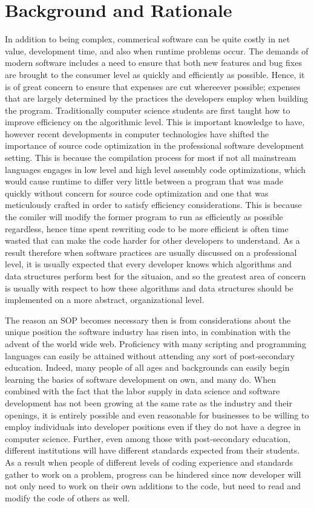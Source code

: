 \documentclass[12pt, letterpaper]{article}
\begin{document}
\section{Background and Rationale}
  In addition to being complex, commerical software can be quite costly in net value, development time, and also when runtime problems occur.
  The demands of modern software includes a need to ensure that both new features and bug fixes are brought to the consumer level as quickly and efficiently as possible. Hence, it is of great
  concern to ensure that expenses are cut whereever possible; expenses that are largely determined by the practices the developers employ when building the program. Traditionally computer
  science students are first taught how to improve efficiency on the algorithmic level. This is important knowledge to have, however recent developments in computer technologies have shifted the importance of
  source code optimization in the professional software development setting. This is because the compilation process for most if not all mainstream languages engages in low level and high level assembly code
  optimizations, which would cause runtime to differ very little between a program that was made quickly without concern for source code optimization and one that was meticulously crafted in order to
  satisfy efficiency considerations. This is because the comiler will modify the former program to run as efficiently as possible regardless, hence time spent rewriting code to be more efficient is often time
  wasted that can make the code harder for other developers to understand. As a result therefore when software practices are usually discussed on a professional level, it is usually expected that every developer
  knows which algorithms and data structures perform best for the situaion, and so the greatest area of concern is usually with respect to how these algorithms and data structures should be implemented on a
  more abstract, organizational level.

  The reason an SOP becomes necessary then is from considerations about the unique position the software industry has risen into, in combination with the advent of the world wide web. Proficiency with many
  scripting and programming languages can easily be attained without attending any sort of post-secondary education. Indeed, many people of all ages and backgrounds can easily begin learning the
  basics of software development on own, and many do. When combined with the fact that the labor supply in data science and software development has not been growing at the same rate as the industry
  and their openings, it is entirely possible and even reasonable for businesses to be willing to employ individuals into developer positions even if they do not have a degree in computer science. Further, even among
  those with post-secondary education, different institutions will have different standards expected from their students. As a result when people of different levels of coding experience and standards
  gather to work on a problem, progress can be hindered since now developer will not only need to work on their own additions to the code, but need to read and modify the code of others as well.
\end{document}
